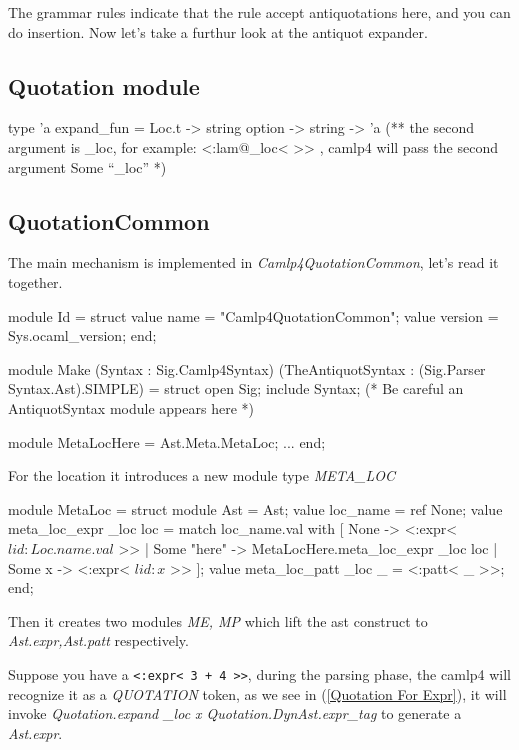 The grammar rules indicate that the rule accept antiquotations here,
and you can do insertion.  Now let's take a furthur look at the
antiquot expander.

\subsection{Quotation module}


\begin{ocamlcode}
type 'a expand_fun = Loc.t -> string option -> string -> 'a
(** the second argument is _loc,
for example: <:lam@_loc< >> , camlp4 will pass the second
argument Some ``_loc''
*)
\end{ocamlcode}


\subsection{QuotationCommon}
\label{QuotationCommon}

The main mechanism is implemented in \textit{Camlp4QuotationCommon},
let's read it together.

\begin{ocamlcode}
module Id = struct
  value name = "Camlp4QuotationCommon";
  value version = Sys.ocaml_version;
end;

module Make (Syntax : Sig.Camlp4Syntax)
            (TheAntiquotSyntax : (Sig.Parser Syntax.Ast).SIMPLE)
= struct
  open Sig;
  include Syntax; (* Be careful an AntiquotSyntax module appears here *)

  module MetaLocHere = Ast.Meta.MetaLoc;
  ...
end;  
\end{ocamlcode}

For the location it introduces a new module type \textit{META\_LOC}

\begin{ocamlcode}
  module MetaLoc = struct
    module Ast = Ast;
    value loc_name = ref None;
    value meta_loc_expr _loc loc =
      match loc_name.val with
      [ None -> <:expr< $lid:Loc.name.val$ >>
      | Some "here" -> MetaLocHere.meta_loc_expr _loc loc
      | Some x -> <:expr< $lid:x$ >> ];
    value meta_loc_patt _loc _ = <:patt< _ >>;
  end;
\end{ocamlcode}

Then it creates two modules \textit{ME, MP} which lift the ast
construct to \textit{Ast.expr,Ast.patt} respectively.

Suppose you have a \verb|<:expr< 3 + 4 >>|, during the parsing phase,
the camlp4 will recognize it as a \textit{QUOTATION} token, as we see
in (\ref{Quotation For Expr}), it will invoke \textit{Quotation.expand
  \_loc x Quotation.DynAst.expr\_tag} to generate a \textit{Ast.expr}.

